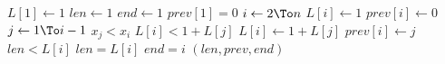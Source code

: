 \begin{codebox}
\li $L[1] \gets 1$
\li $len \gets 1$
\li $end \gets 1$
\li $prev[1] = 0$
\li \For $i \gets 2 \To n$
\li \Do
		$L[i] \gets 1$
\li		$prev[i] \gets 0$
\li		\For $j \gets 1 \To i-1$
\li		\Do \If $x_j < x_i$
\li			\Then \If $L[i] < 1 + L[j]$
\li				\Then
					$L[i] \gets 1 + L[j]$
\li					$prev[i] \gets j$
				\End
			\End
		\End
\li		\If $len < L[i]$
\li		\Then
			$len = L[i]$
\li			$end = i$
		\End
	\End
\li \Return $(len, prev, end)$
\end{codebox}
